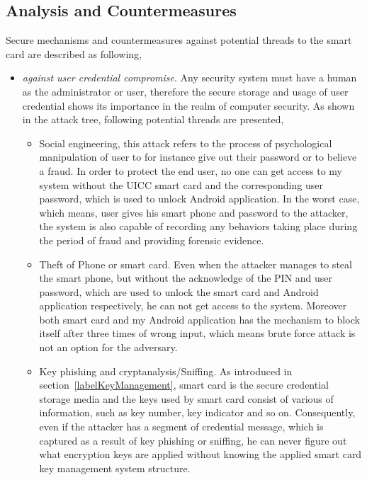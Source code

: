 \subsection{Analysis and Countermeasures}
Secure mechanisms and countermeasures against potential threads to the smart card are described as following,
\begin{itemize}
\item \emph{against user credential compromise}. Any security system must have a human as the administrator or user, therefore the secure storage and usage of user credential shows its importance in the realm of computer security. As shown in the attack tree, following potential threads are presented,
\begin{itemize}
\item Social engineering, this attack refers to the process of psychological manipulation of user to for instance give out their password or to believe a fraud. In order to protect the end user, no one can get access to my system without the UICC smart card and the corresponding user password, which is used to unlock Android  application. In the worst case, which means, user gives his smart phone and password to the attacker, the system is also capable of recording any behaviors taking place during the period of fraud and providing forensic evidence.
\item Theft of Phone or smart card. Even when the attacker manages to steal the smart phone, but without the acknowledge of the PIN and user password, which are used to unlock the smart card and Android application respectively, he can not get access to the system. Moreover both smart card and my Android application has the mechanism to block itself after three times of wrong input, which means brute force attack is not an option for the adversary.
\item Key phishing and cryptanalysis/Sniffing. As introduced in section~\ref{labelKeyManagement}, smart card is the secure  credential  storage media and the keys used by smart card consist of various of information, such as key number, key indicator and so on. Consequently, even if the attacker has a segment of credential message, which is captured as a result of key phishing or sniffing, he can never figure out what encryption keys are applied without knowing the applied smart card key management system structure.
\end{itemize}

\end{itemize}

